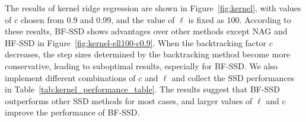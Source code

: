 \documentclass[10pt]{article} %
\numberwithin{equation}{section}
\theoremstyle{plain}
\theoremstyle{definition}
\newcommand{\<}{\langle}
\renewcommand{\>}{\rangle}
\renewcommand{\(}{\left(}
\renewcommand{\)}{\right)}
\renewcommand{\[}{\left[}
\renewcommand{\]}{\right]}
\begin{document}
The results of kernel ridge regression are shown in Figure~\ref{fig:kernel}, with values of $c$ chosen from 0.9 and 0.99, and the value of $\ell$ is fixed as 100. According to these results, BF-SSD shows advantages over other methods except NAG and HF-SSD in Figure~\ref{fig:kernel-ell100-c0.9}. When the backtracking factor $c$ decreases, the step sizes determined by the backtracking method become more conservative, leading to suboptimal results, especially for BF-SSD. We also implement different combinations of $c$ and $\ell$ and collect the SSD performances in Table~\ref{tab:kernel_performance_table}. The results suggest that BF-SSD outperforms other SSD methods for most cases, and larger values of $\ell$ and $c$ improve the performance of BF-SSD.

\end{document}
